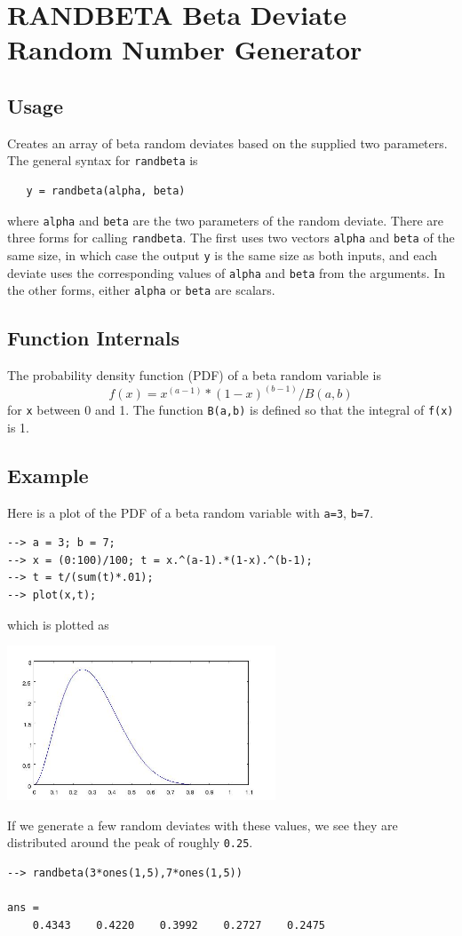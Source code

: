 \section{RANDBETA Beta Deviate Random Number Generator}

\subsection{Usage}

Creates an array of beta random deviates based on the supplied
two parameters. The general syntax for \verb|randbeta| is 
\begin{verbatim}
   y = randbeta(alpha, beta)
\end{verbatim}
where \verb|alpha| and \verb|beta| are the two parameters of the 
random deviate.  There are three forms for calling \verb|randbeta|.
The first uses two vectors \verb|alpha| and \verb|beta| of the same
size, in which case the output \verb|y| is the same size as both
inputs, and each deviate uses the corresponding values of \verb|alpha|
and \verb|beta| from the arguments.  In the other forms, either
\verb|alpha| or \verb|beta| are scalars.
\subsection{Function Internals}

The probability density function (PDF) of a beta random variable
is
\[
f(x) = x^(a-1) * (1-x)^(b-1) / B(a,b)
\]
for \verb|x| between 0 and 1.  The function \verb|B(a,b)| is defined so
that the integral of \verb|f(x)| is 1.
\subsection{Example}

Here is a plot of the PDF of a beta random variable with \verb|a=3|,
\verb|b=7|.
\begin{verbatim}
--> a = 3; b = 7;
--> x = (0:100)/100; t = x.^(a-1).*(1-x).^(b-1); 
--> t = t/(sum(t)*.01);
--> plot(x,t);
\end{verbatim}
which is plotted as


\centerline{\includegraphics[width=8cm]{betapdf}}

If we generate a few random deviates with these values,
we see they are distributed around the peak of roughly
\verb|0.25|.
\begin{verbatim}
--> randbeta(3*ones(1,5),7*ones(1,5))

ans = 
    0.4343    0.4220    0.3992    0.2727    0.2475 
\end{verbatim}
